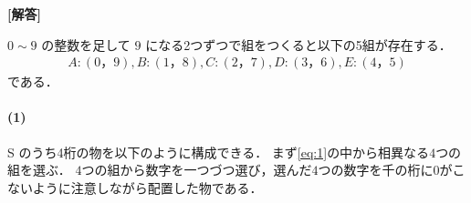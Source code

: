 \documentclass[../../main.tex]{subfiles}
\begin{document}
\begin{oframed}
  
\end{oframed}

{\bf [解答]}

$0 \sim 9$ の整数を足して $9$ になる2つずつで組をつくると以下の5組が存在する．
\begin{align}
  A: (0，9), B: (1，8), C: (2，7),
  D: (3，6), E:(4，5) \label{eq:1}
\end{align}
である．

\paragraph{(1)}

S のうち4桁の物を以下のように構成できる．
まず\cref{eq:1}の中から相異なる$4$つの組を選ぶ．
$4$つの組から数字を一つづつ選び，選んだ$4$つの数字を千の桁に$0$がこないように注意しながら配置した物である．
\end{document}
